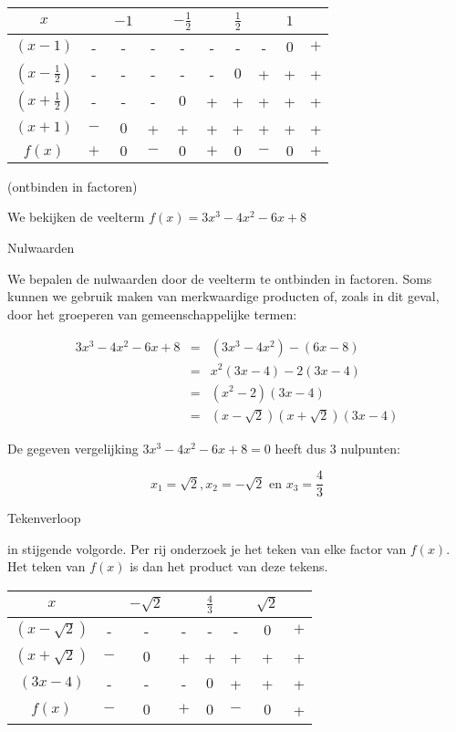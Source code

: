 \begin{voorbeeld}
\begin{center}
\begin{tabular}{c||ccccccccc}
$x$ &  & $-1$ &  & $-\frac{1}{2}$ &  & $\frac{1}{2}$ &  & $1$ & \\
\hline 
$(x-1)$ & - & - & - & - & - & - & - & $0$ & $+$\\
$(x-\frac{1}{2})$ & - & - & - & - & -  & $0$ & + & + & + \\
$(x+\frac{1}{2})$ & - & - & - & $0$ & + & + & + & + & + \\
$(x+1)$ & $-$ & $0$ & + & + & + & + & + & + & + \\
\hline 
$f(x)$ & $+$ & $0$ & $-$ & $0$ & $+$ & $0$ & $-$ & $0$ & $+$\\
\end{tabular}
\end{center}

\end{voorbeeld}

\begin{voorbeeld}
	(ontbinden in factoren)

We bekijken de veelterm $f(x)=3x^{3}-4x^{2}-6x+8$

Nulwaarden

We bepalen de nulwaarden door de veelterm te ontbinden in
factoren. Soms kunnen we gebruik maken van merkwaardige producten
of, zoals in dit geval, door het groeperen van gemeenschappelijke
termen:

\begin{eqnarray*}
3x^{3}-4x^{2}-6x+8 & = & (3x^{3}-4x^{2})-(6x-8)\\
 & = & x^{2}(3x-4)-2(3x-4)\\
 & = & (x^{2}-2)(3x-4)\\
 & = & (x-\sqrt{2})(x+\sqrt{2})(3x-4)
\end{eqnarray*}

 De gegeven vergelijking $3x^{3}-4x^{2}-6x+8=0$ heeft dus
3 nulpunten:

\begin{equation*}
x_{1}=\sqrt{2}, x_{2}=-\sqrt{2} \text{ en } x_{3}=\frac{4}{3}
\end{equation*}

Tekenverloop

in stijgende volgorde. Per rij onderzoek je het teken van elke factor
van $f(x)$. Het teken van $f(x)$ is dan het product van deze tekens.

\begin{center}
\begin{tabular}{c||ccccccc}
$x$ &  & $-\sqrt{2}$ &  & $\frac{4}{3}$ &  & $\sqrt{2}$ & \\
\hline 
$(x-\sqrt{2})$ & - & - & -& -& - & $0$ & $+$ \\
$(x+\sqrt{2})$ & $-$ & $0$ & + & + & +&+&+ \\
$(3x-4)$ & - & - & - & $0$ & +&+&+ \\
\hline 
$f(x)$ & $-$ & $0$ & $+$ & $0$ & $-$ & $0$ & + \\
\end{tabular}
\end{center}


\end{voorbeeld}

